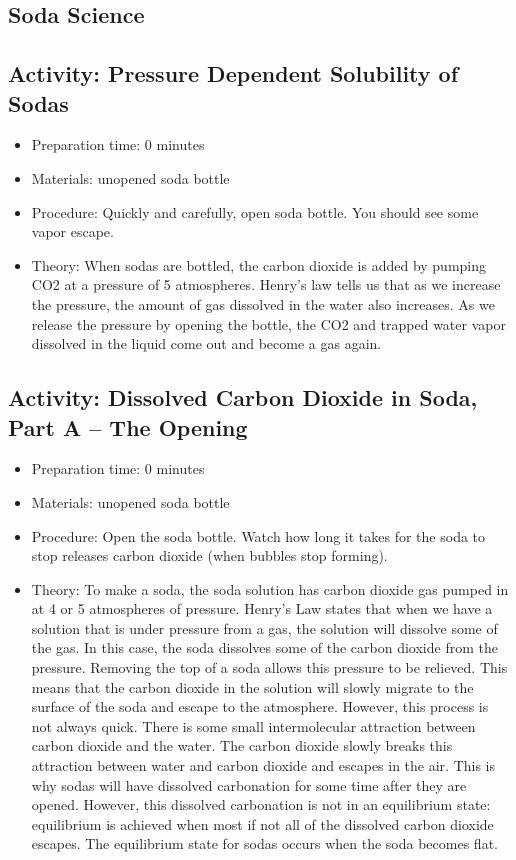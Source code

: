 \begin{itemize}
{\begin{itemize}
\begin{itemize}
{\section{Soda Science}

\subsection{Activity: Pressure Dependent Solubility of Sodas}
\begin{itemize}
\item{Preparation time: 0 minutes}
\item{Materials: unopened soda bottle}
\item{Procedure: Quickly and carefully, open soda bottle. You should see some vapor escape.}
\item{Theory: When sodas are bottled, the carbon dioxide is added by pumping CO2 at a pressure of 5 atmospheres. Henry’s law tells us that as we increase the pressure, the amount of gas dissolved in the water also increases. As we release the pressure by opening the bottle, the CO2 and trapped water vapor dissolved in the liquid come out and become a gas again.}
\end{itemize}

\subsection{Activity: Dissolved Carbon Dioxide in Soda, Part A – The Opening}
\begin{itemize}
\item{Preparation time: 0 minutes}
\item{Materials: unopened soda bottle}
\item{Procedure: Open the soda bottle. Watch how long it takes for the soda to stop releases carbon dioxide (when bubbles stop forming).}
\item{Theory: To make a soda, the soda solution has carbon dioxide gas pumped in at 4 or 5 atmospheres of pressure. Henry’s Law states that when we have a solution that is under pressure from a gas, the solution will dissolve some of the gas. In this case, the soda dissolves some of the carbon dioxide from the pressure. Removing the top of a soda allows this pressure to be relieved. This means that the carbon dioxide in the solution will slowly migrate to the surface of the soda and escape to the atmosphere. However, this process is not always quick. There is some small intermolecular attraction between carbon dioxide and the water. The carbon dioxide slowly breaks this attraction between water and carbon dioxide and escapes in the air. This is why sodas will have dissolved carbonation for some time after they are opened. However, this dissolved carbonation is not in an equilibrium state: equilibrium is achieved when most if not all of the dissolved carbon dioxide escapes. The equilibrium state for sodas occurs when the soda becomes flat.}
\end{itemize}

}
\end{itemize}
\end{itemize}}
\end{itemize}

